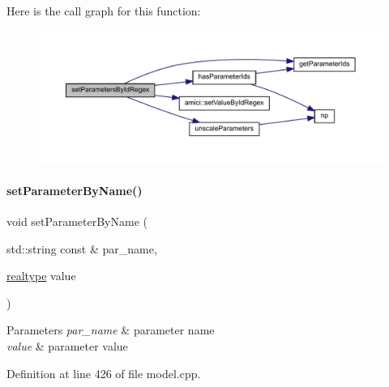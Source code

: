 Here is the call graph for this function\+:
\nopagebreak
\begin{figure}[H]
\begin{center}
\leavevmode
\includegraphics[width=350pt]{classamici_1_1_model_ab66d6b754637ed68449af96f5887a0be_cgraph}
\end{center}
\end{figure}
\mbox{\label{classamici_1_1_model_a6c5ceb2ba684cf68a7f21ad865091200}} 
\paragraph{\texorpdfstring{set\+Parameter\+By\+Name()}{setParameterByName()}}
{\footnotesize\ttfamily void set\+Parameter\+By\+Name (\begin{DoxyParamCaption}\item[{std\+::string const \&}]{par\+\_\+name,  }\item[{\mbox{\hyperlink{namespaceamici_a1bdce28051d6a53868f7ccbf5f2c14a3}{realtype}}}]{value }\end{DoxyParamCaption})}


\begin{DoxyParams}{Parameters}
{\em par\+\_\+name} & parameter name \\
\hline
{\em value} & parameter value \\
\hline
\end{DoxyParams}


Definition at line 426 of file model.\+cpp.

